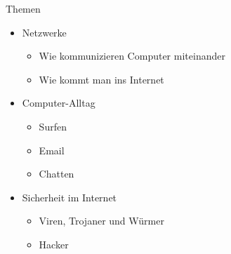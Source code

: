 

\begin{frame}{Themen}
\begin{itemize}
\item Netzwerke 
	  \begin{itemize}
	  \item Wie kommunizieren Computer miteinander
	  \item Wie kommt man ins Internet
	  \end{itemize}
\item Computer-Alltag
	  \begin{itemize}
	  \item Surfen
	  \item Email
	  \item Chatten
	  \end{itemize}
\item Sicherheit im Internet
	  \begin{itemize}
	  \item Viren, Trojaner und Würmer
	  \item Hacker
	  \end{itemize}
\end{itemize}
\end{frame}